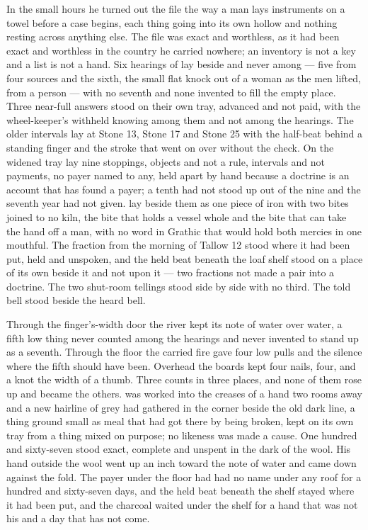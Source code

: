 In the small hours he turned out the file the way a man lays instruments on a towel before a case begins, each thing going into its own hollow and nothing resting across anything else. The file was exact and worthless, as it had been exact and worthless in the country he carried nowhere; an inventory is not a key and a list is not a hand. Six hearings of  lay beside and never among — five from four sources and the sixth, the small flat knock out of a woman as the men lifted, from a person — with no seventh and none invented to fill the empty place. Three near-full answers stood on their own tray, advanced and not paid, with the wheel-keeper's withheld knowing among them and not among the hearings. The older intervals lay at Stone 13, Stone 17 and Stone 25 with the half-beat behind a standing finger and the stroke that went on over  without the check. On the widened tray lay nine stoppings, objects and not a rule, intervals and not payments, no payer named to any, held apart by hand because a doctrine is an account that has found a payer; a tenth had not stood up out of the nine and the seventh year had not given.  lay beside them as one piece of iron with two bites joined to no kiln, the bite that holds a vessel whole and the bite that can take the hand off a man, with no word in Grathic that would hold both mercies in one mouthful. The fraction from the morning of Tallow 12 stood where it had been put, held and unspoken, and the held beat beneath the loaf shelf stood on a place of its own beside it and not upon it — two fractions not made a pair into a doctrine. The two shut-room tellings stood side by side with no third. The told bell stood beside the heard bell.

Through the finger's-width door the river kept its note of water over water, a fifth low thing never counted among the hearings and never invented to stand up as a seventh. Through the floor the carried fire gave four low pulls and the silence where the fifth should have been. Overhead the boards kept four nails, four, and a knot the width of a thumb. Three counts in three places, and none of them rose up and became the others.  was worked into the creases of a hand two rooms away and a new hairline of grey had gathered in the corner beside the old dark line, a thing ground small as meal that had got there by being broken, kept on its own tray from a thing mixed on purpose; no likeness was made a cause. One hundred and sixty-seven stood exact, complete and unspent in the dark of the wool. His hand outside the wool went up an inch toward the note of water and came down against the fold. The payer under the floor had had no name under any roof for a hundred and sixty-seven days, and the held beat beneath the shelf stayed where it had been put, and the charcoal waited under the shelf for a hand that was not his and a day that has not come.
